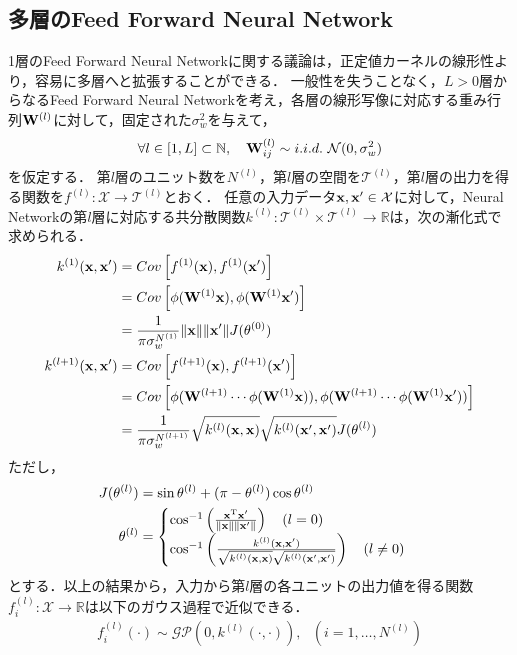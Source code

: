 \documentclass[11pt,a4j]{article}
\begin{document}
    \subsection{多層のFeed Forward Neural Network}
      1層のFeed Forward Neural Networkに関する議論は，正定値カーネルの線形性より，容易に多層へと拡張することができる．
      一般性を失うことなく，$L > 0$層からなるFeed Forward Neural Networkを考え，各層の線形写像に対応する重み行列${\bf W}^{(l)}$に対して，固定された$\sigma^2_w$を与えて，
      \begin{align}
        \forall l \in [1, L] \subset \mathbb{N}, ~~~ {\bf W}^{(l)}_{ij} \sim i.i.d. ~ \mathcal{N}(0, \sigma^2_w)
      \end{align}
      を仮定する．
      第$l$層のユニット数を$N^{(l)}$，第$l$層の空間を$\mathcal{T}^{(l)}$，第$l$層の出力を得る関数を$f^{(l)}: \mathcal{X} \to \mathcal{T}^{(l)}$とおく．
      任意の入力データ${\bf x}, {\bf x}' \in \mathcal{X}$に対して，Neural Networkの第$l$層に対応する共分散関数$k^{(l)}: \mathcal{T}^{(l)} \times \mathcal{T}^{(l)} \to \mathbb{R}$は，次の漸化式で求められる．
      \begin{align}
        k^{(1)}({\bf x}, {\bf x}') &= Cov \left[ f^{(1)}({\bf x}), f^{(1)}({\bf x}') \right] \nonumber \\
                                   &= Cov \left[ \phi({\bf W}^{(1)} {\bf x}), \phi({\bf W}^{(1)} {\bf x}') \right] \nonumber \\ 
                                   &= \frac{1}{\pi \sigma_w^{N^{(1)}}} \| {\bf x} \| \| {\bf x}' \| J(\theta^{(0)}) \\
        k^{(l+1)}({\bf x}, {\bf x}') &= Cov \left[ f^{(l+1)}({\bf x}), f^{(l+1)}({\bf x}') \right] \nonumber \\
                                     &= Cov \left[ \phi( {\bf W}^{(l+1)} \cdots \phi( {\bf W}^{(1)} {\bf x} )), \phi( {\bf W}^{(l+1)} \cdots \phi( {\bf W}^{(1)} {\bf x}' )) \right] \nonumber \\ 
                                     &= \frac{1}{ \pi \sigma_{w}^{ N^{(l+1)}}} \sqrt{ k^{(l)}({\bf x}, {\bf x}) } \sqrt{ k^{(l)}({\bf x}', {\bf x}') } J(\theta^{(l)})
      \end{align}
      ただし，
      \begin{align}
        J(\theta^{(l)}) &= \sin \theta^{(l)} + (\pi - \theta^{(l)}) \cos \theta^{(l)} \\
        \theta^{(l)} &=
        \begin{cases}
          \cos^{-1} \left( \frac{{\bf x}^{\mathrm{T}} {\bf x}'}{ \|{\bf x}\| \|{\bf x}'\| } \right) ~~~ (l = 0) \\
          \cos^{-1} \left( \frac{k^{(l)}( {\bf x}, {\bf x}' )}{ \sqrt{ k^{(l)}({\bf x}, {\bf x}) } \sqrt{ k^{(l)}({\bf x}', {\bf x}') } } \right) ~~~ (l \neq 0) 
        \end{cases}
      \end{align}
      とする．以上の結果から，入力から第$l$層の各ユニットの出力値を得る関数$f^{(l)}_i: \mathcal{X} \to \mathbb{R}$は以下のガウス過程で近似できる．
      \begin{align}
        f^{(l)}_i(\cdot) \sim \mathcal{GP}( 0, k^{(l)}(\cdot,\cdot) ), ~~~ (i=1,\dots,N^{(l)})
      \end{align}
\end{document}
